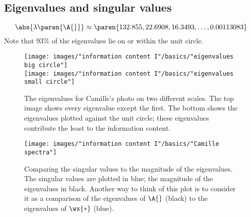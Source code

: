 \subsection{Eigenvalues and singular values}
\begin{equation*}
  \abs{ \lambda \paren{\A{}} } \approx \paren{132.855, 22.6908, 16.3493,\dots,0.00113083}
\end{equation*}
Note that 93\% of the eigenvalues lie on or within the unit circle.
%
\begin{figure}[htbp] %
   \centering
   \texttt{[image: images/"information content I"/basics/"eigenvalues big circle"]} \\[20pt]
   \texttt{[image: images/"information content I"/basics/"eigenvalues small circle"]}
   \caption[The eigenvalues for Camille's photo on two different scales]{The eigenvalues for Camille's photo on two different scales. The top image shows every eigenvalue except the first. The bottom shows the eigenvalues plotted against the unit circle; these eigenvalues contribute the least to the information content.} 
   \label{fig:info content:evalues}
\end{figure}
%
\begin{figure}[htbp] %
   \centering
   \texttt{[image: images/"information content I"/basics/"Camille spectra"]} 
   \caption[Comparing the singular values to the magnitude of the eigenvalues]{Comparing the singular values to the magnitude of the eigenvalues. The singular values are plotted in blue; the magnitude of the eigenvalues in black. Another way to think of this plot is to consider it as a comparison of the eigenvalues of $\A{}$ (black) to the eigenvalues of $\wx{*}$ (blue).}
   \label{fig:info content:spectra}
\end{figure}

\endinput